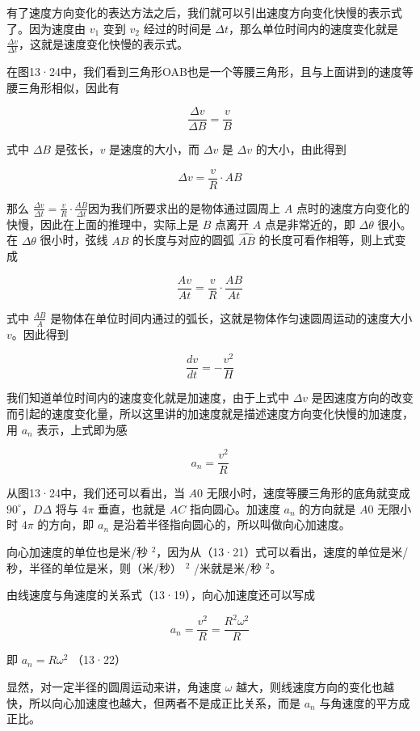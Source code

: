 有了速度方向变化的表达方法之后，我们就可以引出速度方向变化快慢的表示式了。因为速度由
\(v_{1}\) 变到 \(v_{2}\) 经过的时间是
\(\Delta t\)，那么单位时间内的速度变化就是
\(\frac{\Delta v}{\Delta t}\)，这就是速度变化快慢的表示式。

在图13·24中，我们看到三角形OAB也是一个等腰三角形，且与上面讲到的速度等腰三角形相似，因此有

\[
\frac {\Delta v}{\Delta B} = \frac {v}{B}
\]

式中 \(\Delta B\) 是弦长，\(v\) 是速度的大小，而 \(\Delta v\) 是
\(\Delta v\) 的大小，由此得到

\[
\Delta v = \frac {v}{R} \cdot A B
\]

那么
\(\frac{\Delta v}{\Delta t} = \frac{v}{R} \cdot \frac{AB}{\Delta t}\)因为我们所要求出的是物体通过圆周上
\(A\) 点时的速度方向变化的快慢，因此在上面的推理中，实际上是 \(B\)
点离开 \(A\) 点是非常近的，即 \(\Delta \theta\) 很小。在
\(\Delta \theta\) 很小时，弦线 \(AB\) 的长度与对应的圆弧
\(\widehat{AB}\) 的长度可看作相等，则上式变成

\[
\frac {A v}{A t} = \frac {v}{R} \cdot \frac {A B}{A t}
\]

式中 \(\frac{AB}{A}\)
是物体在单位时间内通过的弧长，这就是物体作匀速圆周运动的速度大小
\(v\)。因此得到

\[
\frac {d v}{d t} = - \frac {v ^ {2}}{H}
\]

我们知道单位时间内的速度变化就是加速度，由于上式中 \(\Delta v\)
是因速度方向的改变而引起的速度变化量，所以这里讲的加速度就是描述速度方向变化快慢的加速度，用
\(a_{n}\) 表示，上式即为感

\[
a _ {n} = \frac {v ^ {2}}{R}
\]

从图13·24中，我们还可以看出，当 \(A0\)
无限小时，速度等腰三角形的底角就变成 \(90^{\circ}\)，\(D\Delta\) 将与
\(4\pi\) 垂直，也就是 \(AC\) 指向圆心。加速度 \(a_{n}\) 的方向就是
\(A0\) 无限小时 \(4\pi\) 的方向，即 \(a_{n}\)
是沿着半径指向圆心的，所以叫做向心加速度。

向心加速度的单位也是米/秒
\(^{2}\)，因为从（13·21）式可以看出，速度的单位是米/秒，半径的单位是米，则（米/秒）
\(^{2}\) /米就是米/秒 \(^{2}\)。

由线速度与角速度的关系式（13·19），向心加速度还可以写成

\[
a _ {n} = \frac {v ^ {2}}{R} = \frac {R ^ {2} \omega^ {2}}{R}
\]

即 \(a_{n}=R\omega^{2}\) （13·22）

显然，对一定半径的圆周运动来讲，角速度 \(\omega\)
越大，则线速度方向的变化也越快，所以向心加速度也越大，但两者不是成正比关系，而是
\(a_{n}\) 与角速度的平方成正比。

